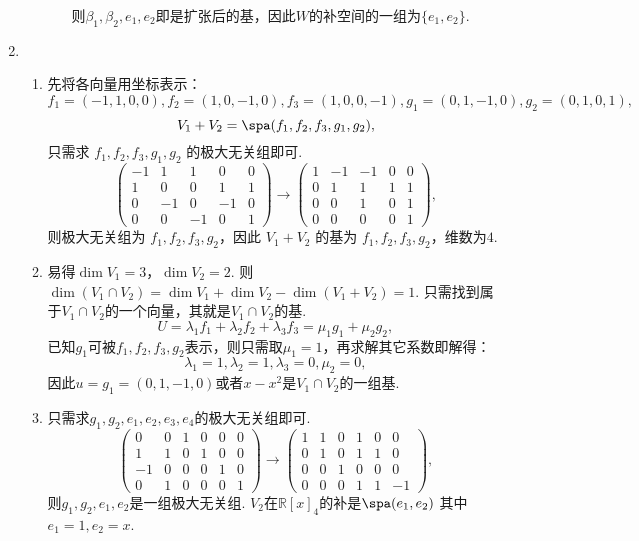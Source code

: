 \begin{enumerate}
\begin{enumerate}
\begin{enumerate}
            则$\beta_1,\beta_2,e_1,e_2$即是扩张后的基，因此$W$的补空间的一组为$\{e_1,e_2\}$.
        \end{enumerate}
    \end{enumerate}
    \item \begin{enumerate}
        \item 先将各向量用坐标表示：
        \[f_1=(-1,1,0,0),f_2=(1,0,-1,0),f_3=(1,0,0,-1),g_1=(0,1,-1,0),g_2=(0,1,0,1),\]
        \[V_1+V_2=\spa(f_1,f_2,f_3,g_1,g_2),\]
        只需求 $f_1,f_2,f_3,g_1,g_2$ 的极大无关组即可.
        \[\begin{pmatrix}-1&1&1&0&0\\1&0&0&1&1\\0&-1&0&-1&0\\0&0&-1&0&1\end{pmatrix}\rightarrow\begin{pmatrix}1&-1&-1&0&0\\0&1&1&1&1\\0&0&1&0&1\\0&0&0&0&1\end{pmatrix},\]
        则极大无关组为 $f_1,f_2,f_3,g_2$，因此 $V_1+V_2$ 的基为 $f_1,f_2,f_3,g_2$，维数为$4$.
        \item 易得$\dim V_1=3$，$\dim V_2=2$. 则$\dim (V_1\cap V_2)= \dim V_1+\dim V_2-\dim (V_1+V_2)=1$. 只需找到属于$V_1\cap V_2$的一个向量，其就是$V_1\cap V_2$的基.
        \[U=\lambda_1f_1+\lambda_2f_2+\lambda_3f_3= \mu_1g_1+\mu_2g_2,\]
        已知$g_1$可被$f_1,f_2,f_3,g_2$表示，则只需取$\mu_1=1$，再求解其它系数即解得：
        \[\lambda_1=1,\lambda_2=1,\lambda_3=0,\mu_2=0,\]
        因此$u=g_1=(0,1,-1,0)$或者$x-x^2$是$V_1\cap V_2$的一组基.
        \item 只需求$g_1,g_2,e_1,e_2,e_3,e_4$的极大无关组即可.
        \[\begin{pmatrix}0&0&1&0&0&0\\1&1&0&1&0&0\\-1&0&0&0&1&0\\0&1&0&0&0&1\end{pmatrix}\rightarrow\begin{pmatrix}1&1&0&1&0&0\\0&1&0&1&1&0\\0&0&1&0&0&0\\0&0&0&1&1&-1\end{pmatrix},\]
        则$g_1,g_2,e_1,e_2$是一组极大无关组.
        $V_2$在$\mathbb R[x]_4$的补是$\spa(e_1,e_2)$
        其中$e_1=1,e_2=x$.
    \end{enumerate}

\end{enumerate}
